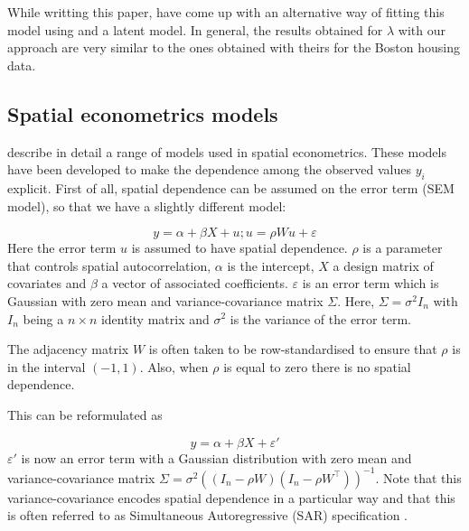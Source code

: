 \documentclass[article]{jss}
\begin{document}
While writting this paper, \citet{LeeMitchell:2013} have come up with an
alternative way of fitting this model using  and a 
latent model. In general, the results obtained for $\lambda$ with our approach
are very similar to the ones obtained with theirs for the Boston housing data.








\subsection{Spatial econometrics models}

\citet{LeSagePace:2009} describe in detail a range of models used in spatial
econometrics. These models have been developed to make the
dependence among the observed values $y_i$ explicit. First of all, spatial dependence
can be assumed on the error term (SEM model), so that we have a slightly different model:

\begin{equation}
y= \alpha+\beta X +u; u=\rho W u+\varepsilon
\end{equation}
\noindent
Here the error term $u$ is assumed to have spatial dependence.  $\rho$ is a
parameter that controls spatial autocorrelation, $\alpha$ is the intercept, $X$
a design matrix of covariates and $\beta$ a vector of associated coefficients.
$\varepsilon$ is an error term which is Gaussian with zero mean and
variance-covariance matrix $\Sigma$. Here, $\Sigma = \sigma^2 I_n$ with $I_n$
being a $n\times n$ identity matrix and $\sigma^2$ is the variance of the error
term.


The adjacency matrix $W$ is often taken to be row-standardised \citep[see, for
example,][]{Haining:2003} to ensure that $\rho$ is in the interval $(-1, 1)$.
Also, when $\rho$ is equal to zero there is no spatial dependence.

This can be reformulated as

\begin{equation}
y= \alpha+\beta X+\varepsilon'
\end{equation}
\noindent
$\varepsilon'$ is now an error term with a Gaussian distribution with zero
mean and variance-covariance matrix $\Sigma=\sigma^2((I_n-\rho W)(I_n-\rho W^\top))^{-1}$.
Note that this variance-covariance encodes spatial dependence in a particular
way and that this is often referred to as Simultaneous Autoregressive (SAR)
specification \citep[see, for example,][]{cressie:1993}.%
\end{document}
